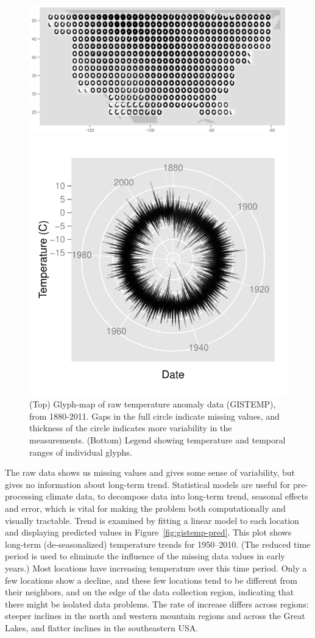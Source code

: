 \documentclass[oneside]{article}
\begin{document}
\begin{figure}[htbp]
  \centering

  \includegraphics[width=1\linewidth]{gistemp-polar-raw}

  \includegraphics[width=0.33\linewidth]{gistemp-polar-legend}

  \caption{(Top) Glyph-map of raw temperature anomaly data (GISTEMP), from 1880-2011. Gaps in the full circle indicate missing values, and thickness of the circle indicates more variability in the measurements.  (Bottom) Legend showing temperature and temporal ranges of individual glyphs.}
  \label{fig:gistemp-raw}
\end{figure}

The raw data shows us missing values and gives some sense of variability, but gives no information about long-term trend. Statistical models are useful for pre-processing climate data, to decompose data into long-term trend, seasonal effects and error, which is vital for making the problem both computationally and visually tractable. Trend is examined by fitting a linear model to each location and displaying predicted values in Figure~\ref{fig:gistemp-pred}. This plot shows long-term (de-seasonalized) temperature trends for 1950--2010. (The reduced time period is used to eliminate the influence of the missing data values in early years.) Most locations have increasing temperature over this time period. Only a few locations show a decline, and these few locations tend to be different from their neighbors, and on the edge of the data collection region, indicating that there might be isolated data problems. The rate of increase differs across regions: steeper inclines in the north and western mountain regions and across the Great Lakes, and flatter inclines in the southeastern USA.
\end{document}

